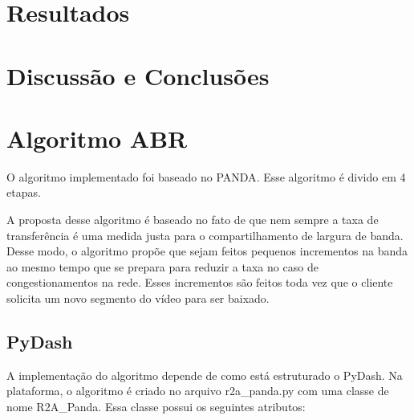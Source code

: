 \documentclass[10pt,twocolumn,letterpaper]{article}
\begin{document}
	
	
	
	\section{Resultados}
	
	
	\section{Discussão e Conclusões}
	
	{\small
		
		
	}
	
\section{Algoritmo ABR}
O algoritmo implementado foi baseado no PANDA\cite{panda}. Esse algoritmo é divido em 4 etapas.

A proposta desse algoritmo é baseado no fato de que nem sempre a taxa de transferência é uma medida justa para o compartilhamento de largura de banda. Desse modo, o algoritmo propõe que sejam feitos pequenos incrementos na banda ao mesmo tempo que se prepara para reduzir a taxa no caso de congestionamentos na rede. Esses incrementos são feitos toda vez que o cliente solicita um novo segmento do vídeo para ser baixado.

\subsection{PyDash}
A implementação do algoritmo depende de como está estruturado o PyDash. Na plataforma, o algoritmo é criado no arquivo r2a\_panda.py com uma classe de nome R2A\_Panda. Essa classe possui os seguintes atributos:
\end{document}
